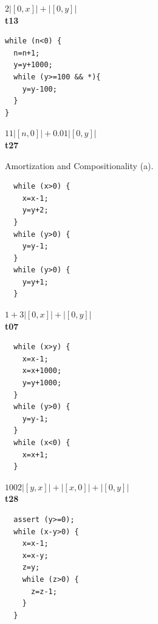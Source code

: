 \documentclass[nocopyrightspace,preprint,pldi]{sigplanconf-pldi15}
\begin{document}
{\begin{figure}
\begin{minipage}[b]{\progwidth}
\begin{center}
$2|[0,x]| + |[0,y]|$
\\[.7\baselineskip]
      {\bf t13}
    \end{center}
  \end{minipage}
%
%
%
  \begin{minipage}[b]{\progwidth}
    \begin{center}
   \begin{lstlisting}
while (n<0) {
  n=n+1;
  y=y+1000;
  while (y>=100 && *){
    y=y-100;
  }
}
   \end{lstlisting}

$11|[n,0]| + 0.01|[0,y]|$
\\[.7\baselineskip]
      {\bf t27}
    \end{center}
  \end{minipage}
   \caption{Amortization and Compositionality (a).}
  \label{fig:cat1a}
\end{figure}


\begin{figure}
 \setlength{\progwidth}{.18\linewidth}
  \centering

  \begin{minipage}[b]{\progwidth}
    \begin{center}
   \begin{lstlisting}
  while (x>0) {
    x=x-1;
    y=y+2;
  }
  while (y>0) {
    y=y-1;
  }
  while (y>0) {
    y=y+1;
  }
   \end{lstlisting}

$1 + 3|[0,x]| + |[0,y]|$
\\[.7\baselineskip]
      {\bf t07}
    \end{center}
  \end{minipage}%
%
%
%
  \begin{minipage}[b]{\progwidth}
    \begin{center}
   \begin{lstlisting}
  while (x>y) {
    x=x-1;
    x=x+1000;
    y=y+1000;
  }
  while (y>0) {
    y=y-1;
  }
  while (x<0) {
    x=x+1;
  }
   \end{lstlisting}

$1002|[y,x]|+|[x,0]|+|[0,y]|$
\\[.7\baselineskip]
      {\bf t28}
    \end{center}
  \end{minipage}%
%
%
  \begin{minipage}[b]{\progwidth}
    \begin{center}
   \begin{lstlisting}
  assert (y>=0);
  while (x-y>0) {
    x=x-1;
    x=x-y;
    z=y;
    while (z>0) {
      z=z-1;
    }
  }
   \end{lstlisting}


\end{center}
\end{minipage}
\end{figure}}
\end{document}
